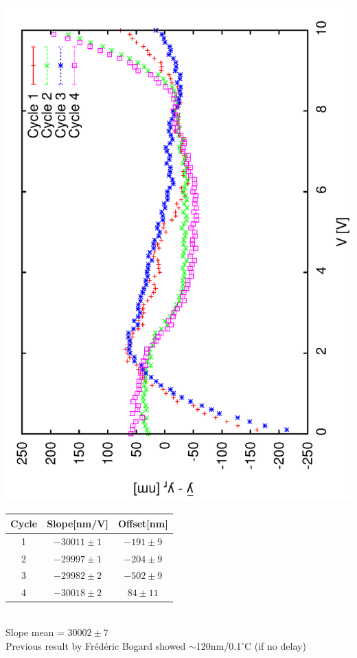 \documentclass[a4paper,11pt]{book}
\begin{document}
\includegraphics[angle=-90,scale=0.22]{image06e.pdf}
\begin{tabular}[]{|c|c|c|}\hline
 Cycle & Slope[nm/V] & Offset[nm] \\\hline
 {\color{red}1} & $-30011 \pm 1$& $-191\pm9$\\
{\color{green}2} & $-29997 \pm 1$& $-204\pm9$ \\
{\color{blue}3} & $-29982 \pm 2$& $-502\pm9$\\
{\color{magenta}4} & $-30018 \pm2$ & $84\pm11$\\\hline
\end{tabular}\\Slope mean = $30002\pm7$\\Previous result by Frédéric Bogard showed $\sim$120nm/0.1$^\circ$C (if no delay)\\
 
\end{document}
